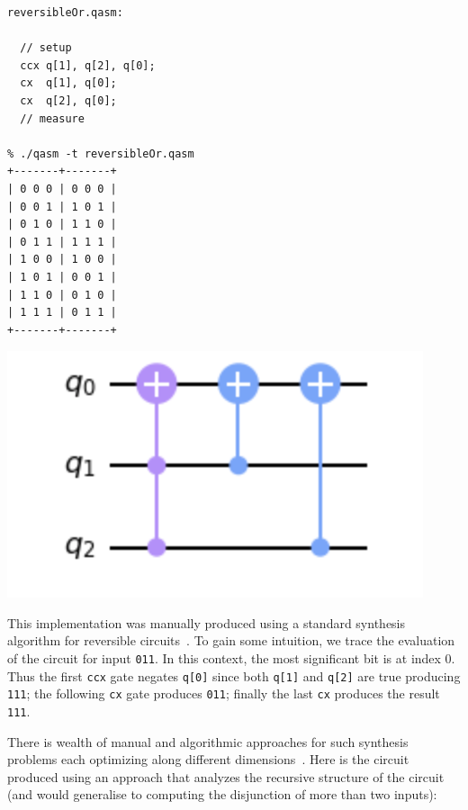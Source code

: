 \begin{center}
  \begin{minipage}[c]{0.4\linewidth}
\begin{verbatim}
reversibleOr.qasm:

  // setup
  ccx q[1], q[2], q[0];
  cx  q[1], q[0];
  cx  q[2], q[0];
  // measure

% ./qasm -t reversibleOr.qasm
+-------+-------+
| 0 0 0 | 0 0 0 |
| 0 0 1 | 1 0 1 |
| 0 1 0 | 1 1 0 |
| 0 1 1 | 1 1 1 |
| 1 0 0 | 1 0 0 |
| 1 0 1 | 0 0 1 |
| 1 1 0 | 0 1 0 |
| 1 1 1 | 0 1 1 |
+-------+-------+
  \end{verbatim}
  \end{minipage}
  \qquad
  \includegraphics[scale=0.7]{reversibleOr.png}
\end{center}

\noindent This implementation was manually produced using a standard synthesis algorithm for reversible
circuits~\cite{10.1145/775832.775915}. To gain some intuition, we trace the evaluation of the circuit for input
\verb|011|. In this context, the most significant bit is at index 0. Thus the first \verb|ccx| gate negates \verb|q[0]|
since both \verb|q[1]| and \verb|q[2]| are true producing \verb|111|; the following \verb|cx| gate produces \verb|011|; finally the last \verb|cx| produces the result \verb|111|.

There is wealth of manual and algorithmic approaches for such synthesis problems each optimizing along  different dimensions~\cite{maslov:2003:rls:1087512,1201583}. Here is the circuit produced using an approach that analyzes the recursive structure of the circuit (and would generalise to computing the disjunction of more than two inputs):

